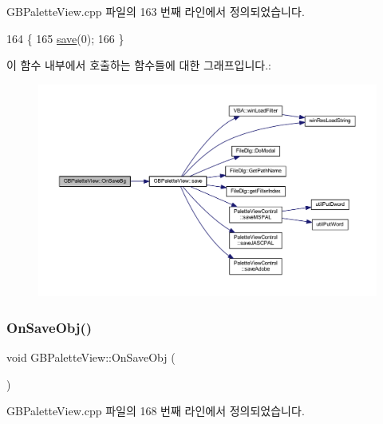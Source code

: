 G\+B\+Palette\+View.\+cpp 파일의 163 번째 라인에서 정의되었습니다.


\begin{DoxyCode}
164 \{
165   \mbox{\hyperlink{class_g_b_palette_view_a90cca0ba09442c669f7403d31e8ab0ee}{save}}(0);
166 \}
\end{DoxyCode}
이 함수 내부에서 호출하는 함수들에 대한 그래프입니다.\+:
\nopagebreak
\begin{figure}[H]
\begin{center}
\leavevmode
\includegraphics[width=350pt]{class_g_b_palette_view_a0186b41f6db460271256f36800ffa980_cgraph}
\end{center}
\end{figure}
\mbox{\label{class_g_b_palette_view_a20eb0c24604804e9c33db15f3ff394f0}} 
\subsubsection{\texorpdfstring{On\+Save\+Obj()}{OnSaveObj()}}
{\footnotesize\ttfamily void G\+B\+Palette\+View\+::\+On\+Save\+Obj (\begin{DoxyParamCaption}{ }\end{DoxyParamCaption})\hspace{0.3cm}{\ttfamily [protected]}}



G\+B\+Palette\+View.\+cpp 파일의 168 번째 라인에서 정의되었습니다.


